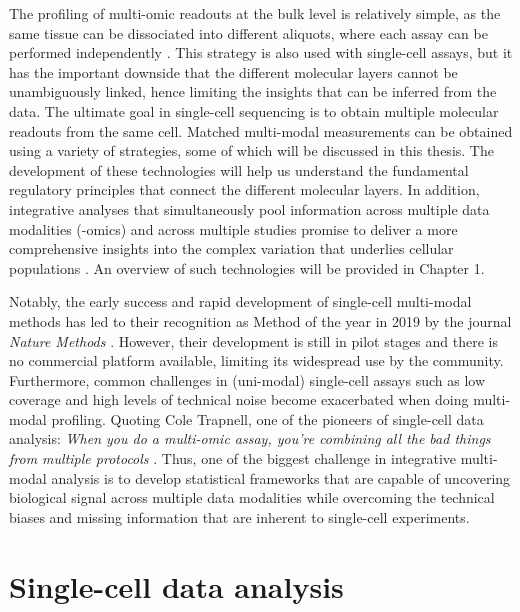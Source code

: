The profiling of multi-omic readouts at the bulk level is relatively simple, as the same tissue can be dissociated into different aliquots, where each assay can be performed independently \cite{Ritchie2015}. This strategy is also used with single-cell assays, but it has the important downside that the different molecular layers cannot be unambiguously linked, hence limiting the insights that can be inferred from the data. The ultimate goal in single-cell sequencing is to obtain multiple molecular readouts from the same cell. Matched multi-modal measurements can be obtained using a variety of strategies, some of which will be discussed in this thesis. The development of these technologies will help us understand the fundamental regulatory principles that connect the different molecular layers. In addition, integrative analyses that simultaneously pool information across multiple data modalities (-omics) and across multiple studies promise to deliver a more comprehensive insights into the complex variation that underlies cellular populations \cite{Stuart2019,Colome-Tatche2018}. An overview of such technologies will be provided in Chapter 1.

Notably, the early success and rapid development of single-cell multi-modal methods has led to their recognition as Method of the year in 2019 by the journal \textit{Nature Methods} \cite{NatMethods2020}. However, their development is still in pilot stages and there is no commercial platform available, limiting its widespread use by the community. Furthermore, common challenges in (uni-modal) single-cell assays such as low coverage and high levels of technical noise become exacerbated when doing multi-modal profiling. Quoting Cole Trapnell, one of the pioneers of single-cell data analysis: \textit{When you do a multi-omic assay, you're combining all the bad things from multiple protocols} \cite{Eisenstein2020}. Thus, one of the biggest challenge in integrative multi-modal analysis is to develop statistical frameworks that are capable of uncovering biological signal across multiple data modalities while overcoming the technical biases and missing information that are inherent to single-cell experiments. 

\section{Single-cell data analysis}

